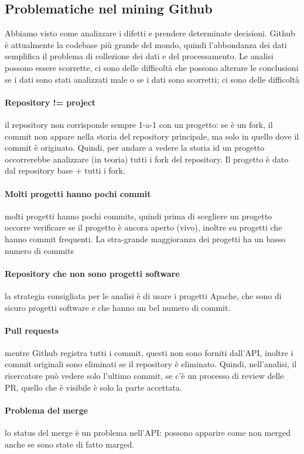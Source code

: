 \documentclass{article}
\begin{document}
\subsection{Problematiche nel mining Github}
Abbiamo visto come analizzare i difetti e prendere determinate decisioni. Github è attualmente la codebase più grande del mondo, quindi l'abbondanza dei dati semplifica il problema di collezione dei dati e del processamento. Le analisi possono essere scorrette, ci sono delle difficoltà che possono alterare le conclusioni se i dati sono stati analizzati male o se i dati sono scorretti; ci sono delle difficoltà
\paragraph{Repository != project}il repository non corrisponde sempre 1-a-1 con un progetto: se è un fork, il commit non appare nella storia del repository principale, ma solo in quello dove il commit è originato. Quindi, per andare a vedere la storia id un progetto occorrerebbe analizzare (in teoria) tutti i fork del repository. Il progetto è dato dal repository base + tutti i fork.
\paragraph{Molti progetti hanno pochi commit}molti progetti hanno pochi commits, quindi prima di scegliere un progetto occorre verificare se il progetto è ancora aperto (vivo), inoltre su progetti che hanno commit frequenti. La stra-grande maggioranza dei progetti ha un basso numero di commits
\paragraph{Repository che non sono progetti software}la strategia consigliata per le analisi è di usare i progetti Apache, che sono di sicuro progetti software e che hanno un bel numero di commit.
\paragraph{Pull requests}mentre Github registra tutti i commit, questi non sono forniti dall'API, inoltre i commit originali sono eliminati se il repository è eliminato. Quindi, nell'analisi, il ricercatore può vedere solo l'ultimo commit, se c'è un processo di review delle PR, quello che è visibile è solo la parte accettata.
\paragraph{Problema del merge}lo status del merge è un problema nell'API: possono apparire come non merged anche se sono state di fatto marged.
\end{document}
